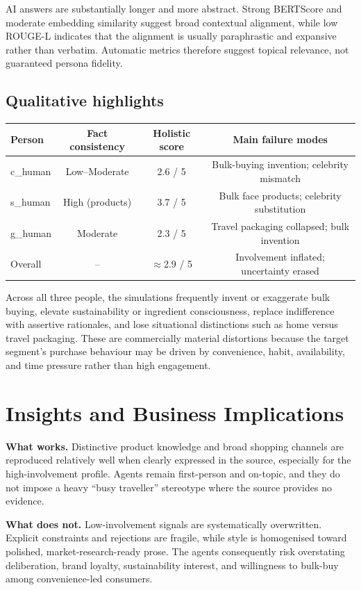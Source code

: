 \documentclass[10pt,a4paper]{article}
\begin{document}
AI answers are substantially longer and more abstract. Strong BERTScore and moderate embedding similarity suggest broad contextual alignment, while low ROUGE-L indicates that the alignment is usually paraphrastic and expansive rather than verbatim. Automatic metrics therefore suggest topical relevance, not guaranteed persona fidelity.

\subsection{Qualitative highlights}
\begin{tabular}{@{}lccc@{}}
\toprule
\textbf{Person} & \textbf{Fact consistency} & \textbf{Holistic score} & \textbf{Main failure modes} \\
\midrule
c\_human & Low--Moderate & 2.6 / 5 & Bulk-buying invention; celebrity mismatch \\
s\_human & High (products) & 3.7 / 5 & Bulk face products; celebrity substitution \\
g\_human & Moderate & 2.3 / 5 & Travel packaging collapsed; bulk invention \\
\midrule
Overall & -- & $\approx$2.9 / 5 & Involvement inflated; uncertainty erased \\
\bottomrule
\end{tabular}

Across all three people, the simulations frequently invent or exaggerate bulk buying, elevate sustainability or ingredient consciousness, replace indifference with assertive rationales, and lose situational distinctions such as home versus travel packaging. These are commercially material distortions because the target segment's purchase behaviour may be driven by convenience, habit, availability, and time pressure rather than high engagement.

\section{Insights and Business Implications}

\textbf{What works.} Distinctive product knowledge and broad shopping channels are reproduced relatively well when clearly expressed in the source, especially for the high-involvement profile. Agents remain first-person and on-topic, and they do not impose a heavy ``busy traveller'' stereotype where the source provides no evidence.

\textbf{What does not.} Low-involvement signals are systematically overwritten. Explicit constraints and rejections are fragile, while style is homogenised toward polished, market-research-ready prose. The agents consequently risk overstating deliberation, brand loyalty, sustainability interest, and willingness to bulk-buy among convenience-led consumers.
\end{document}
